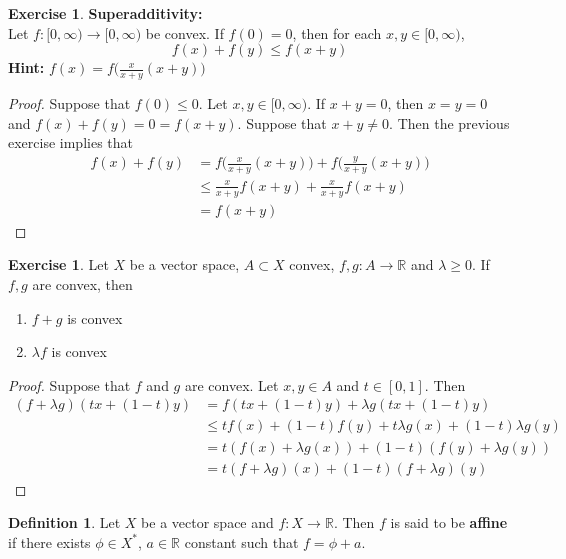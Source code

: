 \documentclass[12pt]{amsart}
\theoremstyle{definition}
\newtheorem{defn}[definition]{Definition}
\newtheorem{ex}[definition]{Exercise}
\newcommand{\lam}{\lambda}
\newcommand{\R}{\mathbb{R}}
\newcommand{\Rg}{[0,\infty)}
\newcommand{\lex}[1]{\label{ex:#1}}
\newcommand{\ld}[1]{\label{defn:#1}}
\begin{document}
	\begin{ex} \textbf{Superadditivity:}\\
		Let $f:\Rg \rightarrow \Rg$ be convex. If $f(0) = 0$, then for each $x,y \in \Rg$, $$f(x) + f(y) \leq f(x+y)$$
		\textbf{Hint:} $f(x) = f \bigg( \frac{x}{x+y}(x+y)\bigg)$
	\end{ex}

	\begin{proof}
		Suppose that $f(0) \leq 0$. Let $x, y \in \Rg$. If $x+y = 0$, then $x=y=0$ and $f(x) + f(y) = 0 = f(x+y)$. Suppose that $x+y \neq 0$. Then the previous exercise implies that 
		\begin{align*}
			f(x) + f(y) 
			&= f \bigg( \frac{x}{x+y}(x+y)\bigg) + f \bigg( \frac{y}{x+y}(x+y)\bigg) \\
			& \leq \frac{x}{x+y}f(x+y) + \frac{x}{x+y}f(x+y) \\
			&= f(x+y)
		\end{align*}
	\end{proof}
	
	\begin{ex} \lex{91005}
	Let $X$ be a vector space, $A \subset X$ convex, $f,g:A \rightarrow \R$ and $\lam \geq 0$. If $f,g$ are convex, then 
	\begin{enumerate}
	\item $f + g$ is convex 
	\item $\lam f$ is convex
	\end{enumerate}
	\end{ex}
	
	\begin{proof}
	Suppose that $f$ and $g$ are convex. Let $x,y \in A$ and $t \in [0,1]$. Then 
	\begin{align*}
	(f + \lam g)(tx + (1-t)y) 
	&= f(tx + (1-t)y) + \lam g(tx + (1-t)y) \\
	& \leq tf(x) + (1-t)f(y) +  t \lam g(x) + (1-t)\lam g(y) \\
	&= t(f(x) + \lam g(x)) + (1-t)(f(y) + \lam g(y))\\
	& = t(f + \lam g)(x) + (1-t)(f + \lam g)(y)
\end{align*}		 
	\end{proof}
	
	
	\begin{defn} \ld{91006}
	Let $X$ be a vector space and $f: X \rightarrow \R$. Then $f$ is said to be \textbf{affine} if there exists $\phi \in X^*$, $a \in \R$ constant such that $f = \phi + a$.\\
	\end{defn}
	
\end{document}
